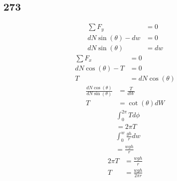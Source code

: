 \documentclass{article}
\begin{document}
\subsection{273}
\begin{align*}
	\sum F_y & = 0 \\
	dN\sin(\theta) - dw & = 0 \\
	dN\sin(\theta) & = dw
\end{align*}
\begin{align*}
	\sum F_x & = 0 \\
	dN\cos(\theta) - T & = 0 \\
	T & = dN\cos(\theta)
\end{align*}
\begin{align*}
	\frac{dN\cos(\theta)}{dN\sin(\theta)} & = \frac{T}{dW} \\
	T & = \cot(\theta)dW
\end{align*}
\begin{align*}
	& \int_0^{2\pi} T d\phi \\
	& = 2\pi T
\end{align*}
\begin{align*}
	& \int_0^w \frac{gh}{r} dw \\
	& = \frac{wgh}{r}
\end{align*}
\begin{align*}
	2\pi T & = \frac{wgh}{r} \\
	T & = \frac{wgh}{2\pi r}
\end{align*}
\end{document}
